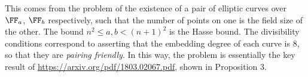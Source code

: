 \begin{remark*}
  This comes from the problem of the existence of
  a pair of elliptic curves over $\FF_a$, $\FF_b$ respectively,
  such that the number of points on one is the field size of the other.
  The bound $n^2 \le a,b < (n+1)^2$ is the Hasse bound.
  The divisibility conditions correspond to asserting that the embedding degree of each curve is $8$,
  so that they are \emph{pairing friendly}.
  In this way, the problem is essentially the key result of \url{https://arxiv.org/pdf/1803.02067.pdf},
  shown in Proposition 3.
\end{remark*}
